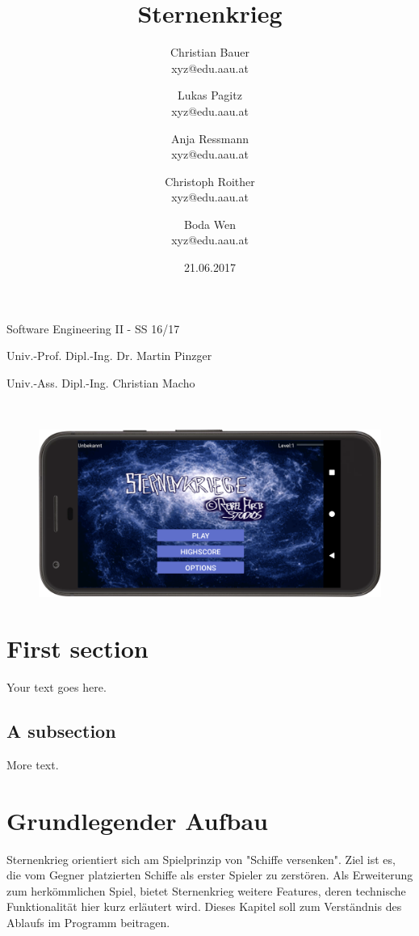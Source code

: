 \documentclass[11pt]{article} %
\title{Sternenkrieg}
\author{Christian Bauer\\ xyz@edu.aau.at
\and Lukas Pagitz \\ xyz@edu.aau.at
\and Anja Ressmann \\ xyz@edu.aau.at
\and Christoph Roither \\ xyz@edu.aau.at
\and Boda Wen \\ xyz@edu.aau.at}
\date{21.06.2017}
\begin{document}
\maketitle

\begin{center}
Software Engineering II - SS 16/17

\hfill \break

Univ.-Prof. Dipl.-Ing. Dr. Martin Pinzger

Univ.-Ass. Dipl.-Ing. Christian Macho

\hfill \break
\\[3em]
\begin{figure}[H]
	\centering
 	\includegraphics[width=1\textwidth]{img/main}
\end{figure}
\end{center}
\hfill \break
\newpage
\tableofcontents

\newpage

\section{First section}

Your text goes here.

\subsection{A subsection}

More text.

\section{Grundlegender Aufbau}
Sternenkrieg orientiert sich am Spielprinzip von "Schiffe versenken". Ziel ist es, die vom Gegner platzierten Schiffe als erster Spieler zu zerstören. Als Erweiterung zum herkömmlichen Spiel, bietet Sternenkrieg weitere Features, deren technische Funktionalität hier kurz erläutert wird. Dieses Kapitel soll zum Verständnis des Ablaufs im Programm beitragen.
\end{document}
